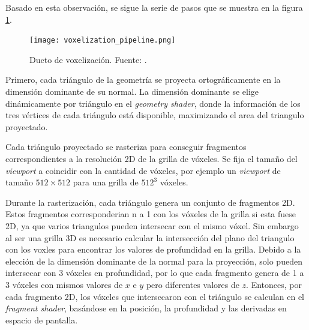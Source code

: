 Basado en esta observación, se sigue la serie de pasos que se muestra en la figura \ref{fig:voxelization_pipeline}.

\begin{figure}[h!]
    \centering
    \texttt{[image: voxelization\_pipeline.png]}
    \caption{Ducto de voxelización. Fuente: \cite{opengl-insights}.}
    \label{fig:voxelization_pipeline}
\end{figure}

Primero, cada triángulo de la geometría se proyecta ortográficamente en la dimensión dominante de su normal.
La dimensión dominante se elige dinámicamente por triángulo en el \textit{geometry shader}, donde la información de los tres vértices de cada triángulo está disponible,
maximizando el area del triangulo proyectado.

Cada triángulo proyectado se rasteriza para conseguir fragmentos correspondientes a la resolución 2D de la grilla de vóxeles.
Se fija el tamaño del \textit{viewport} a coincidir con la cantidad de vóxeles, por ejemplo un \textit{viewport} de tamaño $512\times512$ para una grilla de $512^3$ vóxeles.

Durante la rasterización, cada triángulo genera un conjunto de fragmentos 2D. Estos fragmentos corresponderian n a 1 con los vóxeles de la grilla si esta fuese 2D, ya que varios triangulos pueden intersecar con el mismo vóxel.
Sin embargo al ser una grilla 3D es necesario calcular la intersección del plano del triangulo con los voxles para encontrar los valores de profundidad en la grilla.
Debido a la elección de la dimensión dominante de la normal para la proyección, solo pueden intersecar con 3 vóxeles en profundidad, por lo que cada fragmento genera de 1 a 3 vóxeles con mismos valores de $x$ e $y$ pero diferentes valores de $z$. %
Entonces, por cada fragmento 2D, los vóxeles que intersecaron con el triángulo se calculan en el \textit{fragment shader}, basándose en la posición, la profundidad y las derivadas en espacio de pantalla. %

